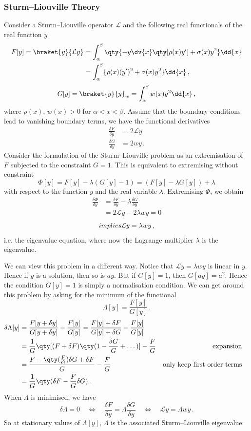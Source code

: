 \documentclass{article}
\theoremstyle{plain}\theoremheaderfont{\normalfont\itshape}\theorembodyfont{\rmfamily}\theoremseparator{.}\newtheorem*{rem}{Remark}\newtheorem*{ex}{Example}\newtheorem*{proof}{Proof}\newtheorem*{altp}{Alternative proof}
\theoremstyle{plain}\theoremheaderfont{\normalfont\bfseries}\theorembodyfont{\rmfamily}\theoremseparator{.}\newtheorem{thm}{Theorem}[section]\newtheorem{lem}[thm]{Lemma}\newtheorem{prop}[thm]{Proposition}\newtheorem*{cor}{Corollary}\newtheorem{defn}[thm]{Definition}\newtheorem{clm}[thm]{Claim}\newtheorem{clminproof}{Claim}
\theoremstyle{break}\theoremheaderfont{\normalfont\itshape}\theorembodyfont{\rmfamily}\theoremseparator{.\medskip}\newtheorem*{proofskip}{Proof}\newtheorem*{exs}{Examples}\newtheorem*{rems}{Remarks}
\theoremstyle{break}\theoremheaderfont{\normalfont\bfseries}\theorembodyfont{\rmfamily}\theoremseparator{.\medskip}\newtheorem{lemskip}[thm]{Lemma}\newtheorem{defnskip}[thm]{Definition}\newtheorem{propskip}[thm]{Proposition}\newtheorem{thmskip}[thm]{Theorem}
\numberwithin{equation}{section}
\begin{document}
	\subsubsection{Sturm--Liouville Theory}
	Consider a Sturm--Liouville operator \(\mathcal{L}\) and the following real functionals of the real function \(y\)
	\begin{align*}
		F[y]=\braket{y}{\mathcal{L}y}&=\int_{\alpha}^{\beta}\qty{-y\dv{x}\qty[\rho(x)y']+\sigma(x)y^2}\dd{x}\\
		&=\int_{\alpha}^{\beta}\{\rho(x)(y')^2+\sigma(x)y^2\}\dd{x}\,,
	\end{align*}
	\[G[y]=\braket{y}{y}_w=\int_{\alpha}^{\beta}w(x)y^2\dd{x}\,,\]
	where \(\rho(x)\), \(w(x)>0\) for \(\alpha<x<\beta\). Assume that the boundary conditions lead to vanishing boundary terms, we have the functional derivatives
	\begin{align*}
		\frac{\delta F}{\delta y}&=2\mathcal{L}y\\
		\frac{\delta G}{\delta y}&=2wy\,.
	\end{align*}
	Consider the formulation of the Sturm--Liouville problem as an extremisation of \(F\) subjected to the constraint \(G=1\). This is equivalent to extremising without constraint
	\[\Phi[y]=F[y]-\lambda(G[y]-1)=(F[y]-\lambda G[y])+\lambda\]
	with respect to the function \(y\) and the real variable \(\lambda\). Extremising \(\Phi\), we obtain
	\begin{align*}
		\frac{\delta \Phi}{\delta y}&=\frac{\delta F}{\delta y}-\lambda\frac{\delta G}{\delta y}\\
		&=2\mathcal{L}y-2\lambda wy=0
	\end{align*}
	\[\\implies \mathcal{L}y=\lambda wy\,,\]
	i.e. the eigenvalue equation, where now the Lagrange multiplier \(\lambda\) is the eigenvalue.

	We can view this problem in a different way. Notice that \(\mathcal{L}y=\lambda wy\) is linear in \(y\). Hence if \(y\) is a solution, then so is \(ay\). But if \(G[y]=1\), then \(G[ay]=a^2\). Hence the condition \(G[y]=1\) is simply a normalisation condition. We can get
	around this problem by asking for the minimum of the functional
	\[\Lambda[y]=\frac{F[y]}{G[y]}\,.\]
	\begin{align*}
		\delta\Lambda[y]&=\frac{F[y+\delta y]}{G[y+\delta y]}-\frac{F[y]}{G[y]}=\frac{F[y]+\delta F}{G[y]+\delta G}-\frac{F[y]}{G[y]}\\
		&=\frac{1}{G}\qty[(F+\delta F)\qty(1-\frac{\delta G}{G}+\dots)]-\frac{F}{G} & \text{expansion}&\\
		&=\frac{F-\qty(\frac{F}{G})\delta G+\delta F}{G}-\frac{F}{G} & \text{only keep first order terms}&\\
		&=\frac{1}{G}\qty(\delta F-\frac{F}{G}\delta G)\,.
	\end{align*}
	When \(\Lambda\) is minimised, we have
	\[\delta\Lambda=0\quad\iff\quad\frac{\delta F}{\delta y}=\Lambda\frac{\delta G}{\delta y}\quad\iff\quad\mathcal{L}y=\Lambda wy\,.\]
	So at stationary values of \(\Lambda[y]\), \(\Lambda\) is the associated Sturm--Liouville eigenvalue.
\end{document}

